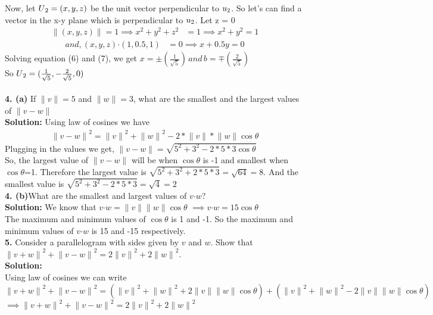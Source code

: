 \documentclass{article}
\begin{document}
Now, let $U\textsubscript{2}=(x,y,z)$ be the unit vector perpendicular to $u\textsubscript{2}$. So let's can find a vector in the x-y plane which is perpendicular to $u\textsubscript{2}$. Let z = 0
\begin{align}
\lVert (x,y,z)\rVert = 1 \implies x^2+y^2+z^2&=1 \implies x^2+y^2 = 1
\end{align}
\begin{align}
and, (x,y,z)\boldsymbol{\cdot}(1,0.5,1)&=0 \implies x+0.5y = 0
\end{align}
Solving equation (6) and (7), we get $x = \pm(\frac{1}{\sqrt{5}})\, and \, b=\mp\left(\frac{2}{\sqrt{5}}\right) $\\
So $U\textsubscript{2}=(\frac{1}{\sqrt{5}},-\frac{2}{\sqrt{5}},0)$\\ \\

\textbf{4. (a)} If $\lVert v \rVert = 5$ and $\lVert w \rVert = 3$, what are the smallest and the largest values of $\lVert v-w \rVert $\\
\textbf{Solution:} Using law of cosines we have
\begin{align*}
{\lVert v-w \rVert}^2 = {\lVert v \rVert} ^2 + {\lVert w \rVert} ^2 - 2*{\lVert v \rVert}*{\lVert w \rVert}\cos\theta
\end{align*}
Plugging in the values we get,
${\lVert v-w \rVert} = \sqrt{5^2+3^2-2*5*3\cos\theta}$\\
So, the largest value of ${\lVert v-w \rVert}$ will be when $\cos\theta$ is -1 and smallest when $\cos\theta$=1. Therefore the largest value is $\sqrt{5^2+3^2+2*5*3} = \sqrt{64} = 8$. And the smallest value is $\sqrt{5^2+3^2-2*5*3} = \sqrt{4} =2 $\\


\textbf{4. (b)}What are the smallest and largest values of $v\boldsymbol{\cdot}w$?\\
\textbf{Solution:} We know that $v\boldsymbol{\cdot}w = {\lVert v \rVert}{\lVert w \rVert}\cos\theta$
$\implies v\boldsymbol{\cdot}w = 15\cos\theta$\\
The maximum and minimum values of $\cos\theta$ is 1 and -1.
So the maximum and minimum values of $v\boldsymbol{\cdot}w$ is 15 and -15 respectively.\\

\textbf{5.} Consider a parallelogram with sides given by $v$ and $w$. Show that ${\lVert v+w \rVert}^2+{\lVert v-w \rVert}^2 = 2{\lVert v\rVert}^2+2{\lVert w \rVert}^2$.\\
\textbf{Solution:} \\
Using law of cosines we can write\\
${\lVert v+w \rVert}^2+{\lVert v-w \rVert}^2 = ({\lVert v\rVert}^2+{\lVert w \rVert}^2+2{\lVert v \rVert}{\lVert w \rVert}\cos\theta)+({\lVert v\rVert}^2+{\lVert w \rVert}^2-2{\lVert v \rVert}{\lVert w \rVert}\cos\theta)$\\
$\implies {\lVert v+w \rVert}^2+{\lVert v-w \rVert}^2 = 2{\lVert v\rVert}^2+2{\lVert w \rVert}^2$\\
\end{document}
